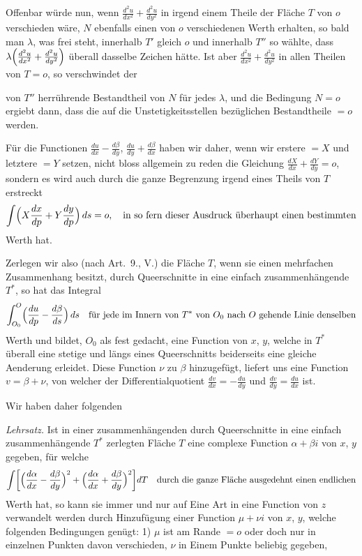 \documentclass{article}
\begin{document}
Offenbar würde nun, wenn $\frac{d^2u}{dx^2} + \frac{d^2u}{dy^2}$ in irgend einem Theile der Fläche $T$ von $o$ verschieden wäre, $N$ ebenfalls einen von $o$ verschiedenen Werth erhalten, so bald man $\lambda$, was frei steht, innerhalb $T'$ gleich $o$ und innerhalb $T''$ so wählte, dass $\lambda \Bigl(\frac{d^2u}{dx^2} + \frac{d^2u}{dy^2}\Bigr)$ überall dasselbe Zeichen hätte. Ist aber $\frac{d^2u}{dx^2} + \frac{d^2u}{dy^2}$ in allen Theilen von $T = o$, so verschwindet der

von $T''$ herrührende Bestandtheil von $N$ für jedes $\lambda$, und die Bedingung $N = o$ ergiebt dann, dass die auf die Unstetigkeitsstellen bezüglichen Bestandtheile $= o$ werden.

Für die Functionen $\frac{du}{dx} - \frac{d\beta}{dy}$, $\frac{du}{dy} + \frac{d\beta}{dx}$ haben wir daher, wenn wir erstere $= X$ und letztere $= Y$ setzen, nicht bloss allgemein zu reden die Gleichung $\frac{dX}{dx} + \frac{dY}{dy} = o$, sondern es wird auch durch die ganze Begrenzung irgend eines Theils von $T$ erstreckt
\[
\int \Bigl(X\frac{dx}{dp} + Y\frac{dy}{dp}\Bigr)\,ds = o, \quad \text{in so fern dieser Ausdruck überhaupt einen bestimmten}
\]
Werth hat.

Zerlegen wir also (nach Art.~9., V.) die Fläche $T$, wenn sie einen mehrfachen Zusammenhang besitzt, durch Queerschnitte in eine einfach zusammenhängende $T^*$, so hat das Integral
\[
\int_{O_0}^O \Bigl(\frac{du}{dp} - \frac{d\beta}{ds}\Bigr)\,ds \quad \text{für jede im Innern von } T^* \text{ von } O_0 \text{ nach } O \text{ gehende Linie denselben}
\]
Werth und bildet, $O_0$ als fest gedacht, eine Function von $x$, $y$, welche in $T^*$ überall eine stetige und längs eines Queerschnitts beiderseits eine gleiche Aenderung erleidet. Diese Function $\nu$ zu $\beta$ hinzugefügt, liefert uns eine Function $v = \beta + \nu$, von welcher der Differentialquotient $\frac{dv}{dx} = -\frac{du}{dy}$ und $\frac{dv}{dy} = \frac{du}{dx}$ ist.

Wir haben daher folgenden

\emph{Lehrsatz.} Ist in einer zusammenhängenden durch Queerschnitte in eine einfach zusammenhängende $T^*$ zerlegten Fläche $T$ eine complexe Function $\alpha + \beta i$ von $x$, $y$ gegeben, für welche
\[
\int \biggl[\Bigl(\frac{d\alpha}{dx} - \frac{d\beta}{dy}\Bigr)^2 + \Bigl(\frac{d\alpha}{dx} + \frac{d\beta}{dy}\Bigr)^2\biggr] dT \quad \text{durch die ganze Fläche ausgedehnt einen endlichen}
\]
Werth hat, so kann sie immer und nur auf Eine Art in eine Function von $z$ verwandelt werden durch Hinzufügung einer Function $\mu + \nu i$ von $x$, $y$, welche folgenden Bedingungen genügt:
1) $\mu$ ist am Rande $= o$ oder doch nur in einzelnen Punkten davon verschieden, $\nu$ in Einem Punkte beliebig gegeben,
\end{document}
